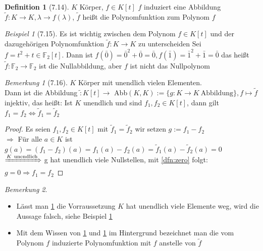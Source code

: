 \documentclass[a4paper]{scrartcl}
\theoremstyle{definition}
\newtheorem{defn}{Definition}
\theoremstyle{plain}
\theoremstyle{plain}
\theoremstyle{remark}
\newtheorem{remark}{Bemerkung}
\theoremstyle{remark}
\theoremstyle{remark}
\newtheorem{ex}{Beispiel}
\begin{document}
\begin{defn}[7.14]
$K$ Körper, $f\in K[t]$
$f$ induziert eine Abbildung $\tilde f: K\to K,\lambda\to f(\lambda)$, $\tilde f$ heißt die Polynomfunktion zum Polynom $f$
\end{defn}
\begin{ex}[7.15]
\label{ex:715}
Es ist wichtig zwischen dem Polynom $f\in K[t]$ und der dazugehörigen Polynomfunktion $\tilde f: K\to K$ zu unterscheiden
Sei $f = t^2 + t \in \mathbb{F}_2 [t]$. Dann ist $f(\bar 0) = \bar 0^2 + \bar 0 = \bar 0, f(\bar 1) = \bar 1^2 + \bar 1 = \bar 0$
das heißt $\tilde f: \mathbb{F}_2 \to \mathbb{F}_2$ ist die Nullabbildung, aber $f$ ist nicht das Nullpolynom
\end{ex}
\begin{remark}[7.16]
\label{remark:716}
$K$ Körper mit unendlich vielen Elementen. \\
  Dann ist die Abbildung $\tilde : K[t]\to$ Abb$(K,K):=\{g:K\to K ~\text{Abbildung}\}, f\mapsto \tilde f$ injektiv, das heißt:
Ist $K$ unendlich und sind $f_1,f_2 \in K[t]$, dann gilt $f_1 = f_2 \Leftrightarrow \tilde f_1 = \tilde f_2$
\end{remark}
\begin{proof}
Es seien $f_1,f_2 \in K[t]$ mit $\tilde f_1 = \tilde f_2$ wir setzen $g:= f_1 - f_2$ \\
  $\Rightarrow$ Für alle $a\in K$ ist $g(a) = (f_1 - f_2)(a) = f_1(a) - f_2(a) = \tilde f_1(a) - \tilde f_2(a) = 0$
$\xRightarrow{K~\text{unendlich}}$ g hat unendlich viele Nullstellen, mit \ref{dfn:zero} folgt: $g = 0\Rightarrow f_1 = f_2$
\end{proof}
\begin{remark}
\begin{itemize}
\item Lässt man \ref{remark:716} die Vorraussetzung $K$ hat unendlich viele Elemente weg, wird die Aussage falsch, siehe Beispiel \ref{ex:715}
\item Mit dem Wissen von \ref{ex:715} und \ref{remark:716} im Hintergrund bezeichnet man die vom Polynom $f$ induzierte Polynomfunktion mit $f$ anstelle von $\tilde f$
\end{itemize}
\end{remark}
\end{document}
